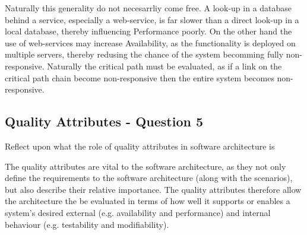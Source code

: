 Naturally this generality do not necesarrliy come free. A look-up in a database behind a service, especially a web-service, is far slower than a direct look-up in a local database, thereby influencing Performance poorly. On the other hand the use of web-services may increase Availability, as the functionality is deployed on multiple servers, thereby redusing the chance of the system becomming fully non-responsive. Naturally the critical path must be evaluated, as if a link on the critical path chain become non-responsive then the entire system becomes non-responsive.

\subsection{Quality Attributes - Question 5}

\begin{question}
Reflect upon what the role of quality attributes in software
architecture is
\end{question}

The quality attributes are vital to the software architecture, as they not only define the requirements to the software architecture (along with the scenarios), but also describe their relative importance. The quality attributes therefore allow the architecture the be evaluated in terms of how well it supports or enables a system's desired external (e.g. availability and performance) and internal behaviour (e.g. testability and modifiability). \cite{h_sarjoughian2002}

